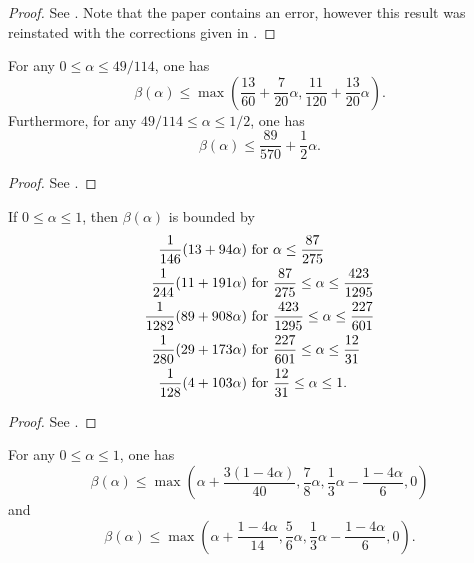 \begin{proof}
See \cite[Theorem~3]{huxley_exponential_1991}. Note that the paper contains an error, however this result was reinstated with the corrections given in \cite{huxley_exponential_1993_1}.
\end{proof}



\begin{theorem}\label{beta-Huxley-4} For any $0 \le \alpha \le 49/114$, one has
\[
\beta(\alpha) \le \max\left(\frac{13}{60} + \frac{7}{20}\alpha, \frac{11}{120} + \frac{13}{20}\alpha\right).
\]
Furthermore, for any $49/114 \le \alpha \le 1/2$, one has
\[
\beta(\alpha) \le \frac{89}{570} + \frac{1}{2}\alpha.
\]
\end{theorem}


\literature
{}

\begin{proof}
See \cite[Theorem~1]{huxley_exponential_1993}.
\end{proof}


\begin{theorem}\label{beta-Huxley-4a} If $0 \leq \alpha \leq 1$, then $\beta(\alpha)$ is bounded by
    \begin{align*}
        \frac{1}{146} (13+94\alpha) & \hbox{ for } \alpha \leq \frac{87}{275} \\
        \frac{1}{244} (11+191\alpha) & \hbox{ for } \frac{87}{275} \leq \alpha \leq \frac{423}{1295} \\
        \frac{1}{1282} (89+908\alpha) & \hbox{ for } \frac{423}{1295} \leq \alpha \leq \frac{227}{601} \\
        \frac{1}{280} (29+173\alpha) & \hbox{ for } \frac{227}{601} \leq \alpha \leq \frac{12}{31} \\
        \frac{1}{128} (4+103\alpha) & \hbox{ for } \frac{12}{31} \leq \alpha \leq 1.
    \end{align*}
\end{theorem}


\literature
{}

\begin{proof}
See \cite[Theorem~3]{huxley_exponential_1993}.
\end{proof}


\begin{theorem}\label{sargos_1995}\cite[Th\'eor\`eme 2.4, Lemme 2.6]{sargos_points_1995}  For any $0 \leq \alpha \leq 1$, one has
$$ \beta(\alpha) \leq \max\left(\alpha + \frac{3(1-4\alpha)}{40}, \frac{7}{8} \alpha, \frac{1}{3}\alpha - \frac{1-4\alpha}{6}, 0\right)$$
and
$$ \beta(\alpha) \leq \max\left(\alpha + \frac{1-4\alpha}{14}, \frac{5}{6} \alpha, \frac{1}{3}\alpha - \frac{1-4\alpha}{6}, 0\right).$$
\end{theorem}


